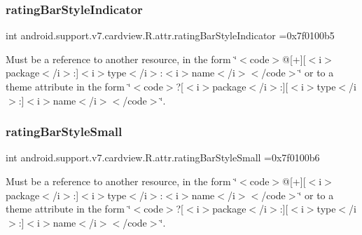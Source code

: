 \subsubsection{\texorpdfstring{rating\+Bar\+Style\+Indicator}{ratingBarStyleIndicator}}
{\footnotesize\ttfamily int android.\+support.\+v7.\+cardview.\+R.\+attr.\+rating\+Bar\+Style\+Indicator =0x7f0100b5\hspace{0.3cm}{\ttfamily [static]}}

Must be a reference to another resource, in the form \char`\"{}$<$code$>$@\mbox{[}+\mbox{]}\mbox{[}$<$i$>$package$<$/i$>$\+:\mbox{]}$<$i$>$type$<$/i$>$\+:$<$i$>$name$<$/i$>$$<$/code$>$\char`\"{} or to a theme attribute in the form \char`\"{}$<$code$>$?\mbox{[}$<$i$>$package$<$/i$>$\+:\mbox{]}\mbox{[}$<$i$>$type$<$/i$>$\+:\mbox{]}$<$i$>$name$<$/i$>$$<$/code$>$\char`\"{}. \mbox{\label{classandroid_1_1support_1_1v7_1_1cardview_1_1R_1_1attr_afa8d9e5d9fb40c29dc437120e60494a8}} 
\subsubsection{\texorpdfstring{rating\+Bar\+Style\+Small}{ratingBarStyleSmall}}
{\footnotesize\ttfamily int android.\+support.\+v7.\+cardview.\+R.\+attr.\+rating\+Bar\+Style\+Small =0x7f0100b6\hspace{0.3cm}{\ttfamily [static]}}

Must be a reference to another resource, in the form \char`\"{}$<$code$>$@\mbox{[}+\mbox{]}\mbox{[}$<$i$>$package$<$/i$>$\+:\mbox{]}$<$i$>$type$<$/i$>$\+:$<$i$>$name$<$/i$>$$<$/code$>$\char`\"{} or to a theme attribute in the form \char`\"{}$<$code$>$?\mbox{[}$<$i$>$package$<$/i$>$\+:\mbox{]}\mbox{[}$<$i$>$type$<$/i$>$\+:\mbox{]}$<$i$>$name$<$/i$>$$<$/code$>$\char`\"{}. \mbox{\label{classandroid_1_1support_1_1v7_1_1cardview_1_1R_1_1attr_a8d57994b6f18c9cf3b202b8b54d95809}} 
